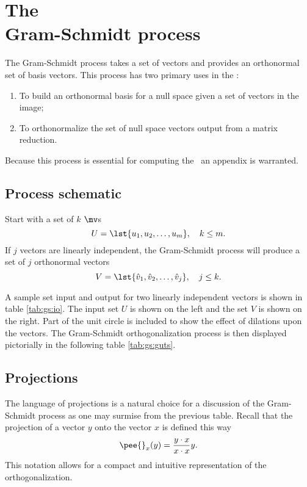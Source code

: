 \chapter[The Gram-Schmidt process]{The \\Gram-Schmidt process}
\label{sec:gs}

The Gram-Schmidt process takes a set of vectors and provides an orthonormal set of basis vectors. This process has two primary uses in the \asvd:
\begin{enumerate}
\item To build an orthonormal basis for a null space given a set of vectors in the image;
\item To orthonormalize the set of null space vectors output from a matrix reduction.
\end{enumerate}

Because this process is essential for computing the \asvd \ an appendix is warranted.

\section{Process schematic}
Start with a set of $k$ $\mv$s
\begin{equation}
  U = \lst{u_{1},u_{2},\dots,u_{m}}, \quad k\le m.
\end{equation}
If $j$ vectors are linearly independent, the Gram-Schmidt process will produce a set of $j$ orthonormal vectors
\begin{equation}
  V = \lst{\hat{v}_{1},\hat{v}_{2},\dots,\hat{v}_{j}}, \quad j\le k.
\end{equation}

A sample set input and output for two linearly independent vectors is shown in table \eqref{tab:gs:io}. The input set $U$ is shown on the left and the set $V$ is shown on the right. Part of the unit circle is included to show the effect of dilations upon the vectors. The Gram-Schmidt orthogonalization process is then displayed pictorially in the following table \eqref{tab:gs:guts}.


\section{Projections}
The language of projections is a natural choice for a discussion of the Gram-Schmidt process as one may surmise from the previous table. Recall that the projection of a vector $y$ onto the vector $x$ is defined this way
\begin{equation}
  \pee{}_{x}(y) = \frac{y\cdot x}{x\cdot x}y.
\end{equation}
This notation allows for a compact and intuitive representation of the orthogonalization.

